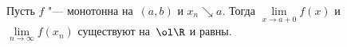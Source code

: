 
{Пусть} $f$ "--- монотонна на~$(a,b)$ и $x_n\searrow a$. Тогда $\lim\limits_{x\to a+0}f(x)$ и $\lim\limits_{n\to \infty}f(x_n)$ существуют на~$\ol\R$ и равны.


